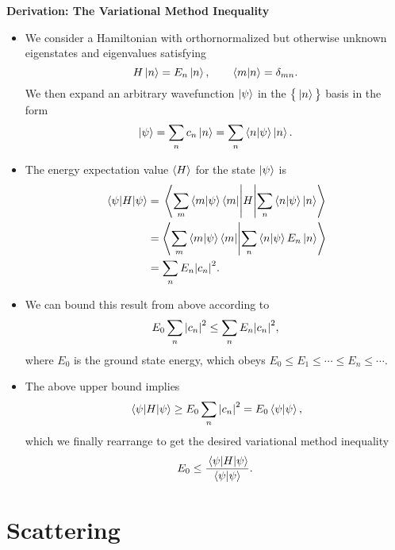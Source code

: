 \documentclass[11pt, a4paper]{article}
\newcommand{\Ham}{Hamiltonian\xspace}
\newcommand{\p}{\psi}  %
\begin{document}
\textbf{Derivation: The Variational Method Inequality}
\begin{itemize}
    \item We consider a \Ham with orthornormalized but otherwise unknown eigenstates and eigenvalues satisfying
    \begin{equation*}
        H \ket{n} = E_{n}\ket{n}, \qquad \braket{m}{n} = \delta_{mn}.
    \end{equation*}
    We then expand an arbitrary wavefunction $ \ket{\psi} $ in the $ \big\{ \ket{n} \big\} $ basis in the form
    \begin{equation*}
        \ket{\psi} = \sum_{n} c_{n}\ket{n} = \sum_{n} \braket{n}{\p}\ket{n}.
    \end{equation*}
    
    \item The energy expectation value $ \ev{H} $ for the state $ \ket{\psi} $ is
    \begin{align*}
        \mel{\psi}{H}{\psi} &= \mel{\sum_{m} \braket{m}{\p}\bra{m}}{H}{\sum_{n} \braket{n}{\p}\ket{n}}\\
        & = \braket{\sum_{m} \braket{m}{\p}\bra{m}}{\sum_{n} \braket{n}{\p}E_{n}\ket{n}}\\
        &= \sum_{n} E_{n}\abs{c_{n}}^{2}.
    \end{align*}
    
    \item We can bound this result from above according to
    \begin{equation*}
        E_{0}\sum_{n} \abs{c_{n}}^{2} \leq \sum_{n} E_{n}\abs{c_{n}}^{2},
    \end{equation*}
    where $ E_{0} $ is the ground state energy, which obeys $ E_{0} \leq E_{1} \leq \cdots \leq E_{n} \leq \cdots $. 

    \item The above upper bound implies
    \begin{equation*}
        \mel{\psi}{H}{\psi} \geq E_{0} \sum_{n}\abs{c_{n}}^{2} = E_{0} \braket{\psi}{\psi},
    \end{equation*}
    which we finally rearrange to get the desired variational method inequality
    \begin{equation*}
        E_{0} \leq \frac{\mel{\psi}{H}{\psi}}{\braket{\psi}{\psi}}.
    \end{equation*}
    
\end{itemize}

\newpage	
\section{Scattering}
\end{document}
